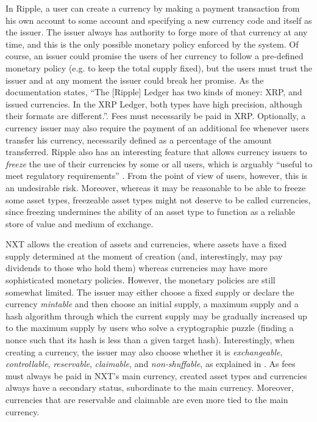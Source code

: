 \documentclass{llncs}
\begin{document}
In Ripple, a user can create a currency by making a payment transaction from his own account to some account and specifying a new currency code and itself as the issuer. The issuer always has authority to forge more of that currency at any time, and this is the only possible monetary policy enforced by the system. Of course, an issuer could promise the users of her currency to follow a pre-defined monetary policy (e.g. to keep the total supply fixed), but the users must trust the issuer and at any moment the issuer could break her promise. As the documentation \cite{RippleCurrencyFormat} states, ``The [Ripple] Ledger has two kinds of money: XRP, and issued currencies. In the XRP Ledger, both types have high precision, although their formats are different.''. Fees must necessarily be paid in XRP. Optionally, a currency issuer may also require the payment of an additional fee whenever users transfer his currency, necessarily defined as a percentage of the amount transferred. Ripple also has an interesting feature that allows currency issuers to \emph{freeze} the use of their currencies by some or all users, which is arguably ``useful to meet regulatory requirements'' \cite{RippleFreeze}. From the point of view of users, however, this is an undesirable risk. Moreover, whereas it may be reasonable to be able to freeze some asset types, freezeable asset types might not deserve to be called currencies, since freezing undermines the ability of an asset type to function as a reliable store of value and medium of exchange.

NXT allows the creation of assets and currencies, where assets have a fixed supply determined at the moment of creation (and, interestingly, may pay dividends to those who hold them) whereas currencies may have more sophisticated monetary policies. However, the monetary policies are still somewhat limited. The issuer may either choose a fixed supply or declare the currency \emph{mintable} and then choose an initial supply, a maximum supply and a hash algorithm through which the current supply may be gradually increased up to the maximum supply by users who solve a cryptographic puzzle (finding a nonce such that its hash is less than a given target hash). Interestingly, when creating a currency, the issuer may also choose whether it is \emph{exchangeable}, \emph{controllable}, \emph{reservable}, \emph{claimable}, and \emph{non-shuffable}, as explained in \cite{NXTCurrencyProperties}. As fees must always be paid in NXT's main currency, created asset types and currencies always have a secondary status, subordinate to the main currency. Moreover, currencies that are reservable and claimable are even more tied to the main currency.
\end{document}
